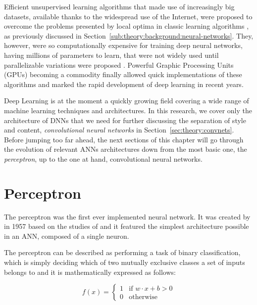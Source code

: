 Efficient unsupervised learning algorithms that made use of increasingly big datasets, available thanks to the widespread use of the Internet, were proposed to overcome the problems presented by local optima in classic learning algorithms \cite{LeCun2004,Hinton2006}, as previously discussed in Section~\ref{sub:theory:background:neural-networks}.
They, however, were so computationally expensive for training deep neural networks, having millions of parameters to learn, that were not widely used until parallelizable variations were proposed \cite{Dean2012,Chen2012}.
Powerful Graphic Processing Units (GPUs) becoming a commodity finally allowed quick implementations of these algorithms and marked the rapid development of deep learning in recent years.

Deep Learning is at the moment a quickly growing field covering a wide range of machine learning techniques and architectures.
In this research, we cover only the architecture of DNNs that we need for further discussing the separation of style and content, \emph{convolutional neural networks} in Section~\ref{sec:theory:convnets}.
Before jumping too far ahead, the next sections of this chapter will go through the evolution of relevant ANNs architectures down from the most basic one, the \emph{perceptron}, up to the one at hand, convolutional neural networks.



\section{Perceptron}
\label{sec:theory:perceptron}

The perceptron was the first ever implemented neural network.
It was created by \citet{Rosenblatt1958} in 1957 based on the studies of \citet{McCulloch1943} and it featured the simplest architecture possible in an ANN, composed of a single neuron.

The perceptron can be described as performing a task of binary classification, which is simply deciding which of two mutually exclusive classes a set of inputs belongs to \cite{Freund1999} and it is mathematically expressed as follows:

$$
  f(x) =
  \begin{cases}
    1 & \text{if } {w}\cdot{x}+b > 0\\
    0 & \text{otherwise}
  \end{cases}
$$

